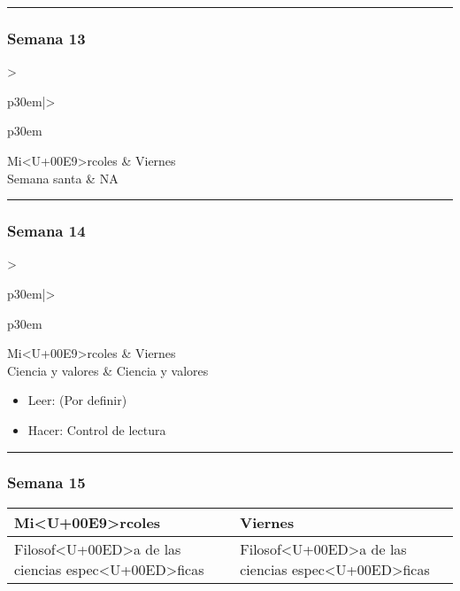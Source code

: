 \documentclass[spanish,]{article}
\begin{document}
\begin{center}\rule{0.5\linewidth}{\linethickness}\end{center}

\subsubsection{Semana 13}\label{semana-13}

\begin{tabular}{>{\raggedright\arraybackslash}p{30em}|>{\raggedright\arraybackslash}p{30em}}
\hline
Mi<U+00E9>rcoles & Viernes\\
\hline
Semana santa & NA\\
\hline
\end{tabular}

\begin{center}\rule{0.5\linewidth}{\linethickness}\end{center}

\subsubsection{Semana 14}\label{semana-14}

\begin{tabular}{>{\raggedright\arraybackslash}p{30em}|>{\raggedright\arraybackslash}p{30em}}
\hline
Mi<U+00E9>rcoles & Viernes\\
\hline
Ciencia y valores & Ciencia y valores\\
\hline
\end{tabular}

\begin{itemize}
\item
  Leer: (Por definir)
\item
  Hacer: Control de lectura
\end{itemize}

\begin{center}\rule{0.5\linewidth}{\linethickness}\end{center}

\subsubsection{Semana 15}\label{semana-15}

\begin{tabular}{>{\raggedright\arraybackslash}p{30em}|>{\raggedright\arraybackslash}p{30em}}
\hline
Mi<U+00E9>rcoles & Viernes\\
\hline
Filosof<U+00ED>a de las ciencias espec<U+00ED>ficas & Filosof<U+00ED>a de las ciencias espec<U+00ED>ficas\\
\hline
\end{tabular}
\end{document}
